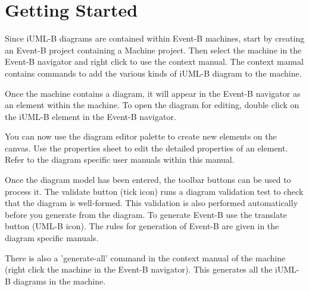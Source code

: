 \section{Getting Started}
\label{sec:iumlb-gettingstarted}

Since iUML-B diagrams are contained within Event-B machines, start by creating an Event-B project containing a Machine project. 
Then select the machine in the Event-B navigator and right click to use the context manual. 
The context manual contains commands to add the various kinds of iUML-B diagram to the machine.

Once the machine contains a diagram, it will appear in the Event-B navigator as an element within the machine.
To open the diagram for editing, double click on the iUML-B element in the Event-B navigator.

You can now use the diagram editor palette to create new elements on the canvas. 
Use the properties sheet to edit the detailed properties of an element.
Refer to the diagram specific user manuals within this manual.

Once the diagram model has been entered, the toolbar buttons can be used to process it.
The validate button (tick icon) runs a diagram validation test to check that the diagram is well-formed.
This validation is also performed automatically before you generate from the diagram.
To generate Event-B use the translate button (UML-B icon). 
The rules for generation of Event-B are given in the diagram specific manuals.

There is also a 'generate-all' command in the context manual of the machine (right click the machine in the Event-B navigator).
This generates all the iUML-B diagrams in the machine.

